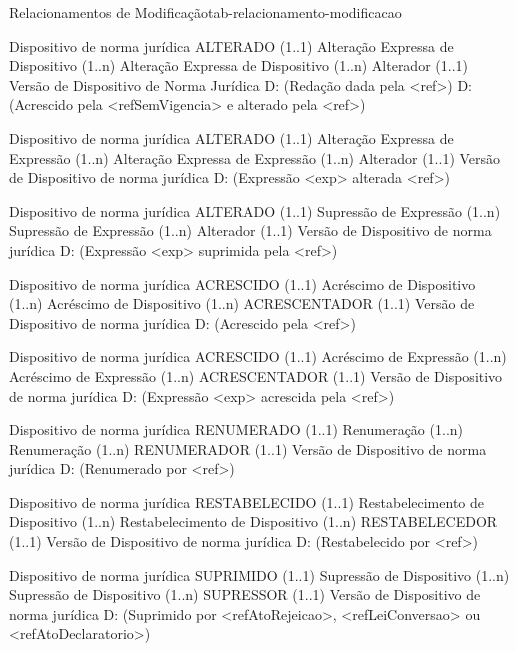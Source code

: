 \begin{tabelarelacionamento}{Relacionamentos
de  Modificação}{tab-relacionamento-modificacao}

 \relacionamento
 	{Dispositivo de norma jurídica}
 	{ALTERADO (1..1)}
 	{Alteração Expressa de Dispositivo}
 	{(1..n) Alteração Expressa de Dispositivo (1..n) 
 	 }
 	{Alterador (1..1)}
 	{Versão de Dispositivo de Norma Jurídica}
 	{D: (Redação dada pela <ref>)
 	 \mypar
 	 D: (Acrescido pela <refSemVigencia> e alterado pela <ref>)}
 	  	 
 \relacionamento
 	{Dispositivo de norma jurídica}
 	{ALTERADO (1..1)}
 	{Alteração Expressa de Expressão}
 	{(1..n) Alteração Expressa de Expressão (1..n) 
 	 \mypar 
 	 [ Tipo: NR ]}
 	{Alterador (1..1)}
 	{Versão de Dispositivo de norma jurídica}
 	{D: (Expressão <exp> alterada <ref>)}

 \relacionamento
 	{Dispositivo de norma jurídica}
 	{ALTERADO (1..1)}
 	{Supressão de Expressão}
 	{(1..n) Supressão de Expressão (1..n) 
 	 \mypar 
 	 [ Tipo: NR ]}
 	{Alterador (1..1)}
 	{Versão de Dispositivo de norma jurídica}
 	{D: (Expressão <exp> suprimida pela <ref>)}

 \relacionamento
 	{Dispositivo de norma jurídica}
 	{ACRESCIDO (1..1)}
 	{Acréscimo de Dispositivo}
 	{(1..n) Acréscimo de Dispositivo (1..n) 
 	 \mypar 
 	 [ Tipo: AC ]}
 	{ACRESCENTADOR (1..1)}
 	{Versão de Dispositivo de norma jurídica}
 	{D: (Acrescido pela <ref>)}

 \relacionamento
 	{Dispositivo de norma jurídica}
 	{ACRESCIDO (1..1)}
 	{Acréscimo de Expressão}
 	{(1..n) Acréscimo de Expressão (1..n) 
 	 \mypar 
 	 [ Tipo: AC ]}
 	{ACRESCENTADOR (1..1)}
 	{Versão de Dispositivo de norma jurídica}
 	{D: (Expressão <exp> acrescida pela <ref>)}

 \relacionamento
 	{Dispositivo de norma jurídica}
 	{RENUMERADO (1..1)}
 	{Renumeração}
 	{(1..n) Renumeração (1..n)}
 	{RENUMERADOR (1..1)}
 	{Versão de Dispositivo de norma jurídica}
 	{D: (Renumerado por <ref>)}

 \relacionamento
 	{Dispositivo de norma jurídica}
 	{RESTABELECIDO (1..1)}
 	{Restabelecimento de Dispositivo}
 	{(1..n) Restabelecimento de Dispositivo (1..n)}
 	{RESTABELECEDOR (1..1)}
 	{Versão de Dispositivo de norma jurídica}
 	{D: (Restabelecido por <ref>)}

 \relacionamento
 	{Dispositivo de norma jurídica}
 	{SUPRIMIDO (1..1)}
 	{Supressão de Dispositivo}
 	{(1..n) Supressão de Dispositivo (1..n)}
 	{SUPRESSOR (1..1)}
 	{Versão de Dispositivo de norma jurídica}
 	{D: (Suprimido por <refAtoRejeicao>, <refLeiConversao> ou <refAtoDeclaratorio>)}
 	
\end{tabelarelacionamento}

